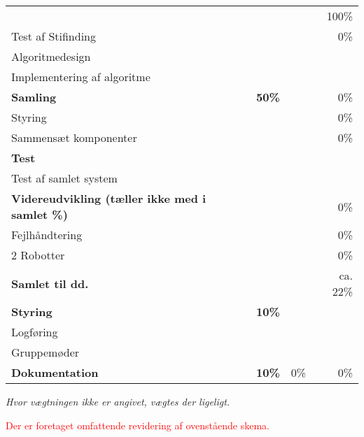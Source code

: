 \begin{footnotesize}
\begin{center}
\begin{tabular}{l | l | r r r}
																&		&		& 		& 100\%\\
	\hspace*{0.3cm}\hspace*{0.3cm}\hspace*{0.3cm} Test af Stifinding
																&		&		& 		& 0\%\\
	\hspace*{0.3cm}\hspace*{0.3cm}\hspace*{0.3cm} Algoritmedesign
																&		&		& 		& \\
	\hspace*{0.3cm}\hspace*{0.3cm}\hspace*{0.3cm} Implementering af algoritme
																&		&		& 		& \\
	\hspace*{0.3cm} \textbf{Samling}
																&		&\textbf{50\%}		& 		& 0\% \\
	\hspace*{0.3cm}\hspace*{0.3cm} Styring
																&		&		& 		& 0\% \\
	\hspace*{0.3cm}\hspace*{0.3cm}\hspace*{0.3cm} Sammensæt komponenter
																&		&		& 		& 0\% \\
	\hspace*{0.3cm}\hspace*{0.3cm} \textbf{Test}
																&		&		& 		& \\
	\hspace*{0.3cm}\hspace*{0.3cm}\hspace*{0.3cm} Test af samlet system
																&		&		& 		& \\
	\hspace*{0.3cm} \textbf{Videreudvikling (tæller ikke med i samlet \%)}
																&		&		& 		& 0\% \\
	\hspace*{0.3cm}\hspace*{0.3cm} Fejlhåndtering
																&		&		& 		& 0\% \\
	\hspace*{0.3cm}\hspace*{0.3cm} 2 Robotter
																&		&		& 		& 0\% \\
	\hspace*{0.3cm} \textbf{Samlet til dd.}
																&		&		& 		&ca. 22\% \\	
	\hline
	\textbf{Styring}
																&		& \textbf{10\%}	& 		& \\
	\hspace*{0.3cm} Logføring
																&		&		& 		& \\
	\hspace*{0.3cm} Gruppemøder	
																&		&		& 		& \\
	\hline
	\textbf{Dokumentation}
																&		& \textbf{10\%}		& 0\%	& 0\%
\end{tabular}
\end{center}
\end{footnotesize}
\textit{Hvor vægtningen ikke er angivet, vægtes der ligeligt.}

\textcolor{red}{Der er foretaget omfattende revidering af ovenstående skema.}